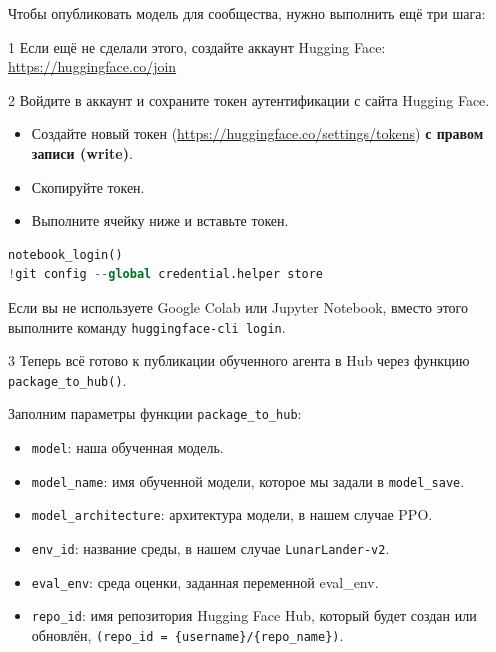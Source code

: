 \documentclass[11pt,a4paper]{article}
\begin{document}
Чтобы опубликовать модель для сообщества, нужно выполнить ещё три шага:

1 Если ещё не сделали этого, создайте аккаунт Hugging Face: \url{https://huggingface.co/join}

2 Войдите в аккаунт и сохраните токен аутентификации с сайта Hugging Face.

\begin{itemize}
\tightlist
\item
  Создайте новый токен (\url{https://huggingface.co/settings/tokens}) \textbf{с правом записи (write)}.
\end{itemize}


\begin{itemize}
\tightlist
\item
  Скопируйте токен.
\item
  Выполните ячейку ниже и вставьте токен.
\end{itemize}

\begin{lstlisting}[language=Python]
notebook_login()
!git config --global credential.helper store
\end{lstlisting}

Если вы не используете Google Colab или Jupyter Notebook, вместо этого выполните команду \passthrough{\lstinline!huggingface-cli login!}.

3 Теперь всё готово к публикации обученного агента в Hub через функцию \passthrough{\lstinline!package_to_hub()!}.

Заполним параметры функции \passthrough{\lstinline!package_to_hub!}:

\begin{itemize}
\tightlist
\item
  \passthrough{\lstinline!model!}: наша обученная модель.
\item
  \passthrough{\lstinline!model_name!}: имя обученной модели, которое мы задали в \passthrough{\lstinline!model_save!}.
\item
  \passthrough{\lstinline!model_architecture!}: архитектура модели, в нашем случае PPO.
\item
  \passthrough{\lstinline!env_id!}: название среды, в нашем случае \passthrough{\lstinline!LunarLander-v2!}.
\item
  \passthrough{\lstinline!eval_env!}: среда оценки, заданная переменной eval\_env.
\item
  \passthrough{\lstinline!repo_id!}: имя репозитория Hugging Face Hub, который будет создан или обновлён, \passthrough{\lstinline!(repo_id = \{username\}/\{repo_name\})!}.
\end{itemize}
\end{document}
